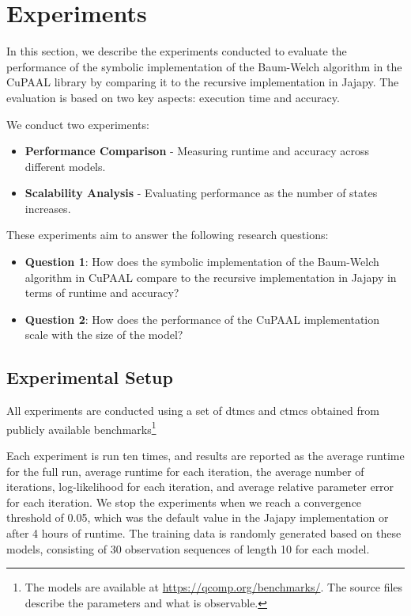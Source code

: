 \section{Experiments}\label{sec:experiments}
In this section, we describe the experiments conducted to evaluate the performance of the symbolic implementation of the Baum-Welch algorithm in the CuPAAL library by comparing it to the recursive implementation in Jajapy. The evaluation is based on two key aspects: execution time and accuracy.

We conduct two experiments:
\begin{itemize}
    \item \textbf{Performance Comparison} - Measuring runtime and accuracy across different models.
    \item \textbf{Scalability Analysis} - Evaluating performance as the number of states increases.
\end{itemize}

These experiments aim to answer the following research questions:
\begin{itemize}
    \item \textbf{Question 1}: How does the symbolic implementation of the Baum-Welch algorithm in CuPAAL compare to the recursive implementation in Jajapy in terms of runtime and accuracy?
    \item \textbf{Question 2}: How does the performance of the CuPAAL implementation scale with the size of the model?
\end{itemize}

\subsection{Experimental Setup}
All experiments are conducted using a set of \glspl{dtmc} and \glspl{ctmc} obtained from publicly available benchmarks\footnote{The models are available at \url{https://qcomp.org/benchmarks/}. The source files describe the parameters and what is observable.}


Each experiment is run ten times, and results are reported as the average runtime for the full run, average runtime for each iteration,
the average number of iterations, log-likelihood for each iteration, and average relative parameter error for each iteration.
We stop the experiments when we reach a convergence threshold of 0.05, which was the default value in the Jajapy implementation or after
4 hours of runtime.
The training data is randomly generated based on these models, consisting of 30 observation sequences of length 10 for each model.

